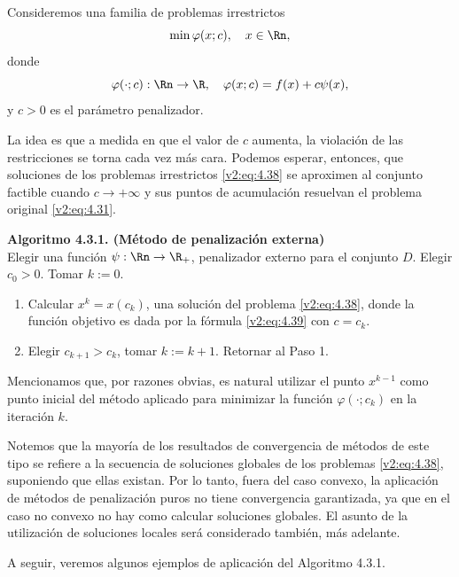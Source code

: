 Consideremos una familia de problemas irrestrictos
\begin{equation}
    \min \varphi(x; c), \quad x \in \Rn,
    \label{v2:eq:4.38}
\end{equation}
donde
\begin{equation}
    \varphi(\cdot; c) : \Rn \to \R, \quad \varphi(x; c) = f(x) + c\psi(x),
    \label{v2:eq:4.39}
\end{equation}
y $c > 0$ es el parámetro penalizador.

La idea es que a medida en que el valor de $c$ aumenta, la violación de las restricciones se torna cada vez más cara. Podemos esperar, entonces, que soluciones de los problemas irrestrictos \eqref{v2:eq:4.38} se aproximen al conjunto factible cuando $c \to +\infty$ y sus puntos de acumulación resuelvan el problema original \eqref{v2:eq:4.31}.

\vspace{0.3cm}
\noindent\textbf{Algoritmo 4.3.1. (Método de penalización externa)}\\
Elegir una función $\psi : \Rn \to \R_+$, penalizador externo para el conjunto $D$. Elegir $c_0 > 0$. Tomar $k := 0$.
\begin{enumerate}
    \item Calcular $x^k = x(c_k)$, una solución del problema \eqref{v2:eq:4.38}, donde la función objetivo es dada por la fórmula \eqref{v2:eq:4.39} con $c = c_k$.
    \item Elegir $c_{k+1} > c_k$, tomar $k := k + 1$. Retornar al Paso 1.
\end{enumerate}
\vspace{0.3cm}

Mencionamos que, por razones obvias, es natural utilizar el punto $x^{k-1}$ como punto inicial del método aplicado para minimizar la función $\varphi(\cdot; c_k)$ en la iteración $k$.

Notemos que la mayoría de los resultados de convergencia de métodos de este tipo se refiere a la secuencia de soluciones globales de los problemas \eqref{v2:eq:4.38}, suponiendo que ellas existan. Por lo tanto, fuera del caso convexo, la aplicación de métodos de penalización puros no tiene convergencia garantizada, ya que en el caso no convexo no hay como calcular soluciones globales. El asunto de la utilización de soluciones locales será considerado también, más adelante.

A seguir, veremos algunos ejemplos de aplicación del Algoritmo 4.3.1.

